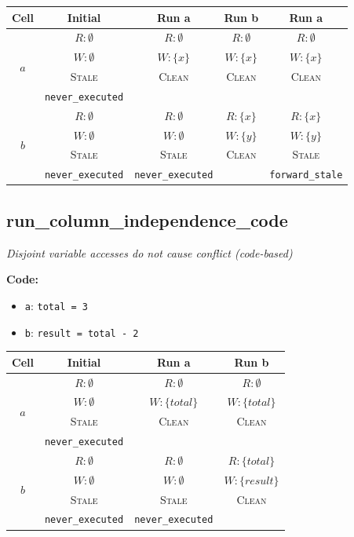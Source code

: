 \documentclass{article}
\begin{document}
\begin{center}
\small
\begin{tabular}{|c|c|c|c|c|}
\hline
\textbf{Cell} & \textbf{Initial} & \textbf{Run a} & \textbf{Run b} & \textbf{Run a} \\
\hline
\multirow{4}{*}{$a$}
  & $R: \emptyset$ & $R: \emptyset$ & $R: \emptyset$ & $R: \emptyset$ \\
  & $W: \emptyset$ & $W: \{x\}$ & $W: \{x\}$ & $W: \{x\}$ \\
  & \textsc{Stale} & \textsc{Clean} & \textsc{Clean} & \textsc{Clean} \\
  & \footnotesize\texttt{never\_executed} &  &  &  \\
\hline
\multirow{4}{*}{$b$}
  & $R: \emptyset$ & $R: \emptyset$ & $R: \{x\}$ & $R: \{x\}$ \\
  & $W: \emptyset$ & $W: \emptyset$ & $W: \{y\}$ & $W: \{y\}$ \\
  & \textsc{Stale} & \textsc{Stale} & \textsc{Clean} & \textsc{Stale} \\
  & \footnotesize\texttt{never\_executed} & \footnotesize\texttt{never\_executed} &  & \footnotesize\texttt{forward\_stale} \\
\hline
\end{tabular}
\end{center}


\subsection{run\_column\_independence\_code}
\textit{Disjoint variable accesses do not cause conflict (code-based)}

\textbf{Code:}
\begin{itemize}
  \item \texttt{a}: \verb|total = 3|
  \item \texttt{b}: \verb|result = total - 2|
\end{itemize}

\begin{center}
\small
\begin{tabular}{|c|c|c|c|}
\hline
\textbf{Cell} & \textbf{Initial} & \textbf{Run a} & \textbf{Run b} \\
\hline
\multirow{4}{*}{$a$}
  & $R: \emptyset$ & $R: \emptyset$ & $R: \emptyset$ \\
  & $W: \emptyset$ & $W: \{total\}$ & $W: \{total\}$ \\
  & \textsc{Stale} & \textsc{Clean} & \textsc{Clean} \\
  & \footnotesize\texttt{never\_executed} &  &  \\
\hline
\multirow{4}{*}{$b$}
  & $R: \emptyset$ & $R: \emptyset$ & $R: \{total\}$ \\
  & $W: \emptyset$ & $W: \emptyset$ & $W: \{result\}$ \\
  & \textsc{Stale} & \textsc{Stale} & \textsc{Clean} \\
  & \footnotesize\texttt{never\_executed} & \footnotesize\texttt{never\_executed} &  \\
\hline
\end{tabular}
\end{center}
\end{document}
